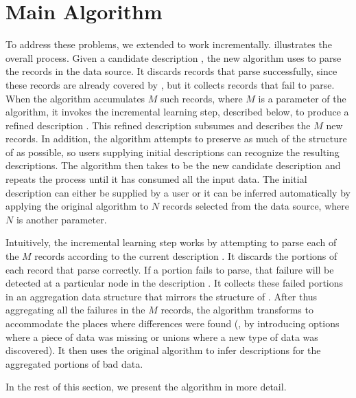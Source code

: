 \section{Main Algorithm}\label{sec:algo}

To address these problems, we extended \learnpads{} to work
incrementally.  
 illustrates the overall process.
Given a candidate description , the new algorithm uses  to parse
the records in the data source.  
It discards records that parse successfully, since these records are
already covered by , but it collects records that fail to parse.
When the algorithm accumulates $M$ such records, where $M$ is a
parameter of the algorithm, it invokes the incremental learning step,
described below, to produce a refined description .  This refined
description subsumes  and describes the $M$
new records.  In addition, the algorithm attempts to preserve as much
of the structure of  as possible, so users supplying initial
descriptions can recognize the resulting descriptions. 
The algorithm then takes 
to be the new candidate description and repeats the process until it
has consumed all the input data.
The initial description  can either be supplied by a user or it
can be inferred automatically by applying the original algorithm to
$N$ records selected from the data source, where $N$ is another
parameter.  


Intuitively, the incremental learning step works by attempting to
parse each of the $M$ records according to the current description
.  It discards the portions of each record that parse correctly.
If a portion fails to parse, that failure will be detected at a
particular node in the description . It collects these failed
portions in an aggregation data structure  that mirrors the
structure of .  After thus aggregating all the failures in the $M$
records, the algorithm transforms  to accommodate the places where
differences were found (\ie, by introducing options where a piece of
data was missing or unions where a new type of data was discovered).
It then uses the original \learnpads{} algorithm to infer descriptions
for the aggregated portions of bad data. 

In the rest of this section, we present the algorithm in more detail.

